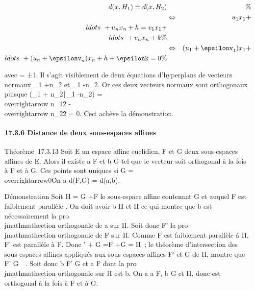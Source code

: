\documentclass[]{article}
\begin{document}
\begin{align*} d(x,H_1) =
d(x,H_2)&& \%& \\ &
\Leftrightarrow & u_1x_1 +
\\ldots~ +
u_nx_n + h =
v_1x_1 +
\\ldots~ +
v_nx_n + k\%&
\\ & \Leftrightarrow &
(u_1 + \epsilonv_1)x_1 +
\\ldots~ +
(u_n + \epsilonv_n)x_n + h + \epsilonk = 0 \%&
\\ \end{align*}

avec \epsilon = ±1. Il s'agit visiblement de deux équations d'hyperplans de
vecteurs normaux \overrightarrown_1
+\overrightarrow n_2 et
\overrightarrown_1
-\overrightarrow n_2. Or ces deux vecteurs
normaux sont orthogonaux puisque
(\overrightarrown_1
+\overrightarrow
n_2∣\overrightarrown_1
-\overrightarrow n_2)
=\\overrightarrow
n_1\^2
-\\overrightarrow
n_2\^2 = 0. Ceci achève la
démonstration.

\paragraph{17.3.6 Distance de deux sous-espaces affines}

Théorème~17.3.13 Soit E un espace affine euclidien, F et G deux
sous-espaces affines de E. Alors il existe a \in F et b \in G tel que le
vecteur \overrightarrowab soit orthogonal à la fois à
F et à G. Ces points sont uniques si \overrightarrowF
\bigcap\overrightarrow G =
\\overrightarrow0\.
On a d(F,G) = d(a,b).

Démonstration Soit H = G +\overrightarrow F le
sous-espace affine contenant G et auquel F est faiblement parallèle . On
doit avoir b \in H et \overrightarrowab \bot H ce qui
montre que b est nécessairement la pro\\jmathmathection orthogonale de a sur H.
Soit donc F' la pro\\jmathmathection orthogonale de F sur H. Comme F est
faiblement parallèle à H, F' est parallèle à F. Donc
\overrightarrowF' +\overrightarrow
G =\overrightarrow F
+\overrightarrow G =\overrightarrow
H~; le théorème d'intersection des sous-espaces affines appliqués aux
sous-espaces affines F' et G de H, montre que F' \bigcap
G\neq~\varnothing~. Soit donc b \in F' \bigcap G et a \in F dont la
pro\\jmathmathection orthogonale sur H est b. On a a \in F, b \in G et
\overrightarrowab \bot H, donc
\overrightarrowab est orthogonal à la fois à F et à
G.
\end{document}
